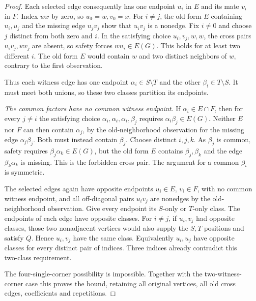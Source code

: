 \documentclass[11pt]{article}
\theoremstyle{definition}
\theoremstyle{remark}
\begin{document}
\begin{proof}
Each selected edge consequently has one endpoint $u_i$ in $E$ and its mate
$v_i$ in $F$. Index $wx$ by zero, so $u_0=w,v_0=x$. For $i\ne j$, the
old form $E$ containing $u_i,u_j$ and the missing edge $u_jv_j$ show that
$u_iv_j$ is a nonedge. Fix $i\ne0$ and choose $j$ distinct from both zero
and $i$. In the satisfying choice $u_i,v_j,w,w$, the cross pairs
$u_iv_j,wv_j$ are absent, so safety forces $wu_i\in E(G)$. This holds
for at least two different $i$. The old form $E$ would contain $w$ and two
distinct neighbors of $w$, contrary to the first observation.

Thus each witness edge has one endpoint $\alpha_i\in S\setminus T$ and
the other $\beta_i\in T\setminus S$. It must meet both unions, so these
two classes partition its endpoints.

\emph{The common factors have no common witness endpoint.} If
$\alpha_i\in E\cap F$, then for every $j\ne i$ the satisfying choice
$\alpha_i,\alpha_i,\alpha_i,\beta_j$ requires
$\alpha_i\beta_j\in E(G)$. Neither $E$ nor $F$ can then contain
$\alpha_j$, by the old-neighborhood observation for the missing edge
$\alpha_j\beta_j$. Both must instead contain $\beta_j$.
Choose distinct $i,j,k$. As $\beta_j$ is common, safety requires
$\beta_j\alpha_k\in E(G)$, but the old form $E$ contains
$\beta_j,\beta_k$ and the edge $\beta_k\alpha_k$ is missing. This is
the forbidden cross pair. The argument for a common $\beta_i$ is symmetric.

The selected edges again have opposite endpoints $u_i\in E$, $v_i\in F$,
with no common witness endpoint, and all off-diagonal pairs $u_iv_j$ are
nonedges by the old-neighborhood observation. Give every endpoint its
$S$-only or $T$-only class. The endpoints of each edge have opposite classes.
For $i\ne j$, if $u_i,v_j$ had opposite classes, those two nonadjacent
vertices would also supply the $S,T$ positions and satisfy $Q$. Hence
$u_i,v_j$ have the same class. Equivalently $u_i,u_j$ have opposite classes
for every distinct pair of indices. Three indices already contradict this
two-class requirement.

The four-single-corner possibility is impossible. Together with the
two-witness-corner case this proves the bound, retaining all original
vertices, all old cross edges, coefficients and repetitions.
\end{proof}
\end{document}
